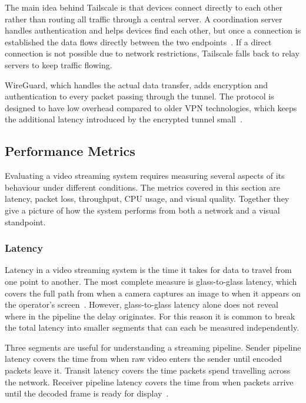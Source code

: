 The main idea behind Tailscale is that devices connect directly to each other rather than routing all traffic through a central server. A coordination server handles authentication and helps devices find each other, but once a connection is established the data flows directly between the two endpoints~\cite{tailscale_what}. If a direct connection is not possible due to network restrictions, Tailscale falls back to relay servers to keep traffic flowing.
 
WireGuard, which handles the actual data transfer, adds encryption and authentication to every packet passing through the tunnel. The protocol is designed to have low overhead compared to older VPN technologies, which keeps the additional latency introduced by the encrypted tunnel small~\cite{donenfeld2017wireguard}.

 

\subsection{Performance Metrics}\label{sec:metrics}
Evaluating a video streaming system requires measuring several aspects of its behaviour under different conditions. The metrics covered in this section are latency, packet loss, throughput, CPU usage, and visual quality. Together they give a picture of how the system performs from both a network and a visual standpoint.

\subsubsection{Latency}\label{subsec:latency-metric}
Latency in a video streaming system is the time it takes for data to travel from one point to another. The most complete measure is glass-to-glass latency, which covers the full path from when a camera captures an image to when it appears on the operator's screen~\cite{kaknjo2018}. However, glass-to-glass latency alone does not reveal where in the pipeline the delay originates. For this reason it is common to break the total latency into smaller segments that can each be measured independently.
 
Three segments are useful for understanding a streaming pipeline. Sender pipeline latency covers the time from when raw video enters the sender until encoded packets leave it. Transit latency covers the time packets spend travelling across the network. Receiver pipeline latency covers the time from when packets arrive until the decoded frame is ready for display~\cite{kaknjo2018}.
 
